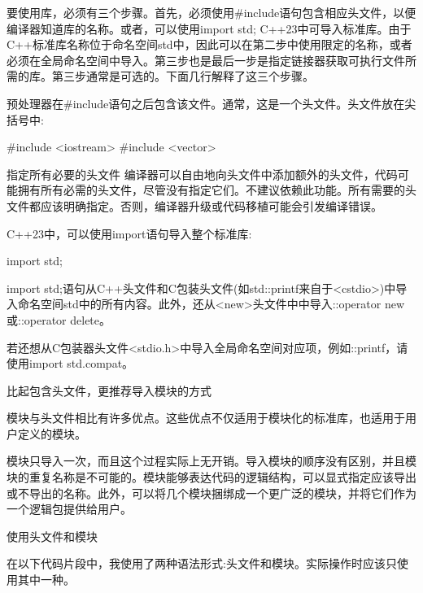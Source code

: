 要使用库，必须有三个步骤。首先，必须使用\#include语句包含相应头文件，以便编译器知道库的名称。或者，可以使用import std; C++23中可导入标准库。由于C++标准库名称位于命名空间std中，因此可以在第二步中使用限定的名称，或者必须在全局命名空间中导入。第三步也是最后一步是指定链接器获取可执行文件所需的库。第三步通常是可选的。下面几行解释了这三个步骤。


预处理器在\#include语句之后包含该文件。通常，这是一个头文件。头文件放在尖括号中:

\begin{cpp}
#include <iostream>
#include <vector>
\end{cpp}

\begin{myWarning}{指定所有必要的头文件}
编译器可以自由地向头文件中添加额外的头文件，代码可能拥有所有必需的头文件，尽管没有指定它们。不建议依赖此功能。所有需要的头文件都应该明确指定。否则，编译器升级或代码移植可能会引发编译错误。
\end{myWarning}


C++23中，可以使用import语句导入整个标准库:

\begin{cpp}
import std;
\end{cpp}

import std;语句从C++头文件和C包装头文件(如std::printf来自于<cstdio>)中导入命名空间std中的所有内容。此外，还从<new>头文件中中导入::operator new或::operator delete。

若还想从C包装器头文件<stdio.h>中导入全局命名空间对应项，例如::printf，请使用import std.compat。

\begin{myWarning}{比起包含头文件，更推荐导入模块的方式}

模块与头文件相比有许多优点。这些优点不仅适用于模块化的标准库，也适用于用户定义的模块。

模块只导入一次，而且这个过程实际上无开销。导入模块的顺序没有区别，并且模块的重复名称是不可能的。模块能够表达代码的逻辑结构，可以显式指定应该导出或不导出的名称。此外，可以将几个模块捆绑成一个更广泛的模块，并将它们作为一个逻辑包提供给用户。

\end{myWarning}

\begin{myWarning}{使用头文件和模块}

在以下代码片段中，我使用了两种语法形式:头文件和模块。实际操作时应该只使用其中一种。

\end{myWarning}

